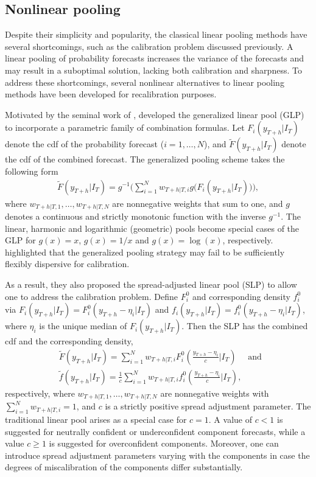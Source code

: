 \documentclass[a4paper,11pt]{article}
\begin{document}
\subsection{Nonlinear pooling}
\label{sec:nonlinear_pooling}

Despite their simplicity and popularity, the classical linear pooling methods have several shortcomings, such as the calibration problem discussed previously. A linear pooling of probability forecasts increases the variance of the forecasts and may result in a suboptimal solution, lacking both calibration and sharpness. To address these shortcomings, several nonlinear alternatives to linear pooling methods have been developed for recalibration purposes.

Motivated by the seminal work of \citet{Dawid1995-jj}, \citet{Gneiting2013-hl} developed the generalized linear pool (GLP) to incorporate a parametric family of combination formulas. Let $F_{i}(y_{T+h}|I_{T})$ denote the cdf of the probability forecast ($i=1,\dots,N$), and $\tilde{F}(y_{T+h}|I_{T})$ denote the cdf of the combined forecast. The generalized pooling scheme takes the following form
\begin{align*}
  \tilde{F}(y_{T+h}|I_{T}) = g^{-1}\bigg(\sum_{i=1}^{N} w_{T+h|T,i} g\big(F_{i}(y_{T+h}|I_{T})\big)\bigg),
\end{align*}
where $w_{T+h|T,1},\dots,w_{T+h|T,N}$ are nonnegative weights that sum to one, and $g$ denotes a continuous and strictly monotonic function with the inverse $g^{-1}$. The linear, harmonic and logarithmic (geometric) pools become special cases of the GLP for $g(x)=x$, $g(x)=1/x$ and $g(x)=\log(x)$, respectively. \citet{Gneiting2013-hl} highlighted that the generalized pooling strategy may fail to be sufficiently flexibly dispersive for calibration.

As a result, they also proposed the spread-adjusted linear pool (SLP) to allow one to address the calibration problem. Define $F_{i}^{0}$ and corresponding density $f_{i}^{0}$ via $F_{i}(y_{T+h}|I_{T})=F_{i}^{0}(y_{T+h}-\eta_{i}|I_{T})$ and $f_{i}(y_{T+h}|I_{T})=f_{i}^{0}(y_{T+h}-\eta_{i}|I_{T})$, where $\eta_{i}$ is the unique median of $F_{i}(y_{T+h}|I_{T})$. Then the SLP has the combined cdf and the corresponding density,
\begin{align*}
   & \tilde{F}(y_{T+h}|I_{T})=\sum_{i=1}^{N} w_{T+h|T,i} F_{i}^{0}\left(\frac{y_{T+h}-\eta_{i}}{c}\bigg|I_{T}\right) \quad \text { and } \\
   & \tilde{f}(y_{T+h}|I_{T})=\frac{1}{c} \sum_{i=1}^{N} w_{T+h|T,i} f_{i}^{0}\left(\frac{y_{T+h}-\eta_{i}}{c}\bigg|I_{T}\right),
\end{align*}
respectively, where $w_{T+h|T,1},\dots,w_{T+h|T,N}$ are nonnegative weights with $\sum_{i=1}^{N}w_{T+h|T,i}=1$, and $c$ is a strictly positive spread adjustment parameter. The traditional linear pool arises as a special case for $c = 1$. A value of $c < 1$ is suggested for neutrally confident or underconfident component forecasts, while a value $c \geq 1$ is suggested for overconfident components. Moreover, one can introduce spread adjustment parameters varying with the components in case the degrees of miscalibration of the components differ substantially.
\end{document}
